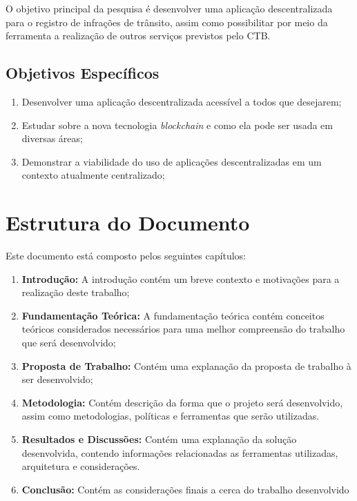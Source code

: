     O objetivo principal da pesquisa é desenvolver uma aplicação descentralizada para o registro de infrações de trânsito, assim como possibilitar por meio da ferramenta a realização de outros serviços previstos pelo CTB.
    
    \subsection{Objetivos Específicos}
    
    \begin{enumerate}
        \item Desenvolver uma aplicação descentralizada acessível a todos que desejarem;
        \item Estudar sobre a nova tecnologia \textit{blockchain} e como ela pode ser usada em diversas áreas;
        \item Demonstrar a viabilidade do uso de aplicações descentralizadas em um contexto atualmente centralizado;
    \end{enumerate}
    
    
\section{Estrutura do Documento}

Este documento está composto pelos seguintes capítulos:

\begin{enumerate}
    \item \textbf{Introdução:} A introdução contém um breve contexto e motivações para a realização deste trabalho;
    \item \textbf{Fundamentação Teórica:} A fundamentação teórica contém conceitos teóricos considerados necessários para uma melhor compreensão do trabalho que será desenvolvido;
    \item \textbf{Proposta de Trabalho:} Contém uma explanação da proposta de trabalho à ser desenvolvido;
    \item \textbf{Metodologia:} Contém descrição da forma que o projeto será desenvolvido, assim como metodologias, políticas e ferramentas que serão utilizadas.
    \item \textbf{Resultados e Discussões:} Contém uma explanação da solução desenvolvida, contendo informações relacionadas as ferramentas utilizadas, arquitetura e considerações.
    \item \textbf{Conclusão:} Contém as considerações finais a cerca do trabalho desenvolvido
\end{enumerate}

